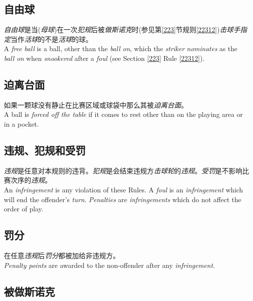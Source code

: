 \subsection{自由球}

\noindent \emph{自由球}是当(\emph{母球})在一次\emph{犯规}后被\emph{做斯诺克}时(参见第\ref{223}节规则\ref{22312})\emph{击球手}\emph{指定}当作\emph{活球}的不是\emph{活球}的球。\\
A \emph{free ball} is a ball, other than the \emph{ball on}, which the \emph{striker} \emph{nominates} as the \emph{ball on} when \emph{snookered} after a \emph{foul} (see Section \ref{223} Rule \ref{22312}).

\subsection{迫离台面}

\noindent 如果一颗球没有静止在比赛区域或球袋中那么其被\emph{迫离台面}。\\
A ball is \emph{forced off the table} if it comes to rest other than on the 
playing area or in a pocket.

\subsection{违规、犯规和受罚}

\noindent \emph{违规}是任意对本规则的违背。\emph{犯规}是会结束违规方\emph{击球轮}的\emph{违规}。\emph{受罚}是不影响比赛次序的\emph{违规}。\\
An \emph{infringement} is any violation of these Rules. A \emph{foul} is an \emph{infringement} which will end the offender's \emph{turn}. \emph{Penalties} are \emph{infringements} which do not affect the order of play.

\subsection{罚分}

\noindent 在任意\emph{违规}后\emph{罚分}都被加给非违规方。\\
\emph{Penalty points} are awarded to the non-offender after any \emph{infringement}.

\subsection{被做斯诺克}\label{22217}

